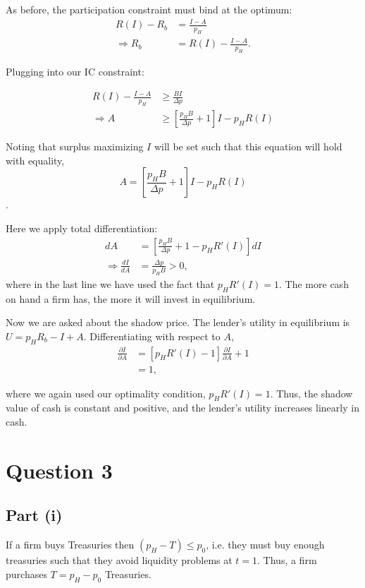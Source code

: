 \documentclass[11pt]{article} %
\begin{document}
As before, the participation constraint must bind at the optimum:
\begin{align*}
R(I) - R_b &= \frac{I-A}{p_H}\\
\Rightarrow R_b &= R(I) - \frac{I-A}{p_H}.
\end{align*}

Plugging into our IC constraint:

\begin{align*}
R(I) - \frac{I-A}{p_H} &\geq \frac{BI}{\Delta p}\\
\Rightarrow A &\geq \left[\frac{p_H B}{\Delta p} + 1\right] I - p_H R(I)
\end{align*}

Noting that surplus maximizing $I$ will be set such that this equation will hold with equality, $$A =  \left[\frac{p_H B}{\Delta p} + 1\right] I - p_H R(I) $$.

Here we apply total differentiation:
\begin{align*}
dA &=  \left[\frac{p_H B}{\Delta p} + 1 -p_H R'(I)\right] dI\\
\Rightarrow \frac{dI}{dA} &= \frac{\Delta p}{p_H B}>0,
\end{align*}
where in the last line we have used the fact that $p_HR'(I) = 1$. The more cash on hand a firm has, the more it will invest in equilibrium.

Now we are asked about the shadow price. The lender's utility in equilibrium is $U=p_H R_b - I+A$. Differentiating with respect to $A$, 
\begin{align*}
\frac{\partial I}{\partial A} &= [p_H R'(I) - 1]\frac{\partial I}{\partial A} + 1\\
&=  1,
\end{align*}

where we again used our optimality condition, $p_HR'(I) = 1$. Thus, the shadow value of cash is constant and positive, and the lender's utility increases linearly in cash.

\section{Question 3}
\subsection{Part (i)}
If a firm buys Treasuries then $(p_H - T)\leq p_0$, i.e. they must buy enough treasuries such that they avoid liquidity problems at $t=1$. Thus, a firm purchases $T=p_H-p_0$ Treasuries.
\end{document}
